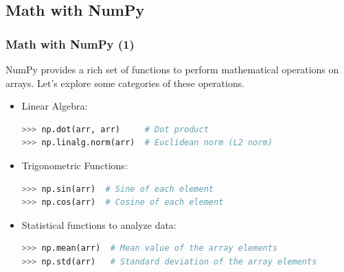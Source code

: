 \subsection*{Math with NumPy}
\begin{frame}[fragile]
  \frametitle{Math with NumPy (1)}
  NumPy provides a rich set of functions to perform mathematical operations on arrays. Let's explore some categories of these operations.
  \begin{itemize}
    \item Linear Algebra:
    \begin{lstlisting}[language=Python, numbers=none]
>>> np.dot(arr, arr)     # Dot product
>>> np.linalg.norm(arr)  # Euclidean norm (L2 norm)
    \end{lstlisting}\pause
    
    \item Trigonometric Functions:
  \begin{lstlisting}[language=Python, numbers=none]
>>> np.sin(arr)  # Sine of each element
>>> np.cos(arr)  # Cosine of each element
  \end{lstlisting}
  
  \item Statistical functions to analyze data:
  \begin{lstlisting}[language=Python, numbers=none]
>>> np.mean(arr)  # Mean value of the array elements
>>> np.std(arr)   # Standard deviation of the array elements
  \end{lstlisting}\pause
\end{itemize}
\end{frame}

